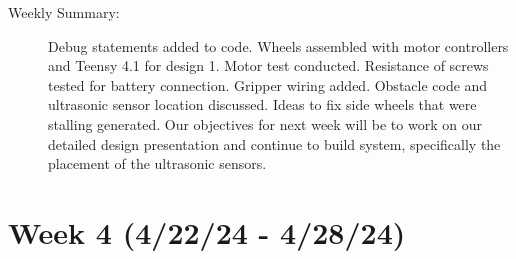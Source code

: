 \documentclass[11pt]{report}
\begin{document}
\begin{adjustwidth}{0.5cm}{0cm}
\begin{description}
    \item [Weekly Summary:]Debug statements added to code. Wheels assembled with motor controllers and Teensy 4.1 for design 1. Motor test conducted. Resistance of screws tested for battery connection. Gripper wiring added. Obstacle code and ultrasonic sensor location discussed. Ideas to fix side wheels that were stalling generated. Our objectives for next week will be to work on our detailed design presentation and continue to build system, specifically the placement of the ultrasonic sensors.
\end{description}\vspace{0.5em}
\end{adjustwidth}

\section{Week 4 (4/22/24 - 4/28/24)}
\end{document}

